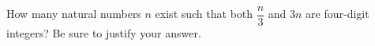 How many natural numbers $n$ exist such that both $\dfrac{n}{3}$ and $3n$ are four-digit integers? Be sure to justify your answer.
